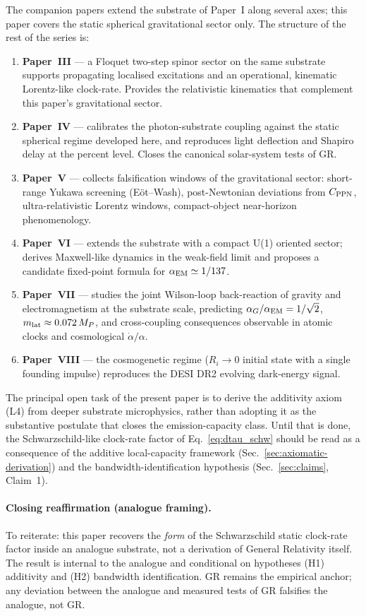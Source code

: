 \documentclass[11pt,a4paper]{article}
\begin{document}
The companion papers extend the substrate of Paper~I along several
axes; this paper covers the static spherical gravitational sector
only. The structure of the rest of the series is:

\begin{enumerate}
\item \textbf{Paper~III} --- a Floquet two-step spinor sector on the
same substrate supports propagating localised excitations and an
operational, kinematic Lorentz-like clock-rate. Provides the
relativistic kinematics that complement this paper's
gravitational sector.
\item \textbf{Paper~IV} --- calibrates the photon-substrate coupling
against the static spherical regime developed here, and reproduces
light deflection and Shapiro delay at the percent level. Closes
the canonical solar-system tests of GR.
\item \textbf{Paper~V} --- collects falsification windows of the
gravitational sector: short-range Yukawa screening (E\"ot--Wash),
post-Newtonian deviations from $C_{\rm PPN}$, ultra-relativistic
Lorentz windows, compact-object near-horizon phenomenology.
\item \textbf{Paper~VI} --- extends the substrate with a compact U(1)
oriented sector; derives Maxwell-like dynamics in the weak-field
limit and proposes a candidate fixed-point formula for
$\alpha_{\rm EM} \simeq 1/137$.
\item \textbf{Paper~VII} --- studies the joint Wilson-loop
back-reaction of gravity and electromagnetism at the substrate
scale, predicting $\alpha_G/\alpha_{\rm EM} = 1/\sqrt{2}$,
$m_{\rm lat} \approx 0.072\,M_P$, and cross-coupling consequences
observable in atomic clocks and cosmological $\dot\alpha/\alpha$.
\item \textbf{Paper~VIII} --- the cosmogenetic regime
($R_i \to 0$ initial state with a single founding impulse)
reproduces the DESI DR2 evolving dark-energy signal.
\end{enumerate}

The principal open task of the present paper is to derive the
additivity axiom (L4) from deeper substrate microphysics, rather
than adopting it as the substantive postulate that closes the
emission-capacity class. Until that is done, the
Schwarzschild-like clock-rate factor of
Eq.~\eqref{eq:dtau_schw} should be read as a consequence of the
additive local-capacity framework
(Sec.~\ref{sec:axiomatic-derivation}) and the
bandwidth-identification hypothesis
(Sec.~\ref{sec:claims}, Claim~1).





\paragraph{Closing reaffirmation (analogue framing).}
To reiterate: this paper recovers the \emph{form} of the
Schwarzschild static clock-rate factor inside an analogue
substrate, not a derivation of General Relativity itself. The
result is internal to the analogue and conditional on
hypotheses (H1) additivity and (H2) bandwidth identification.
GR remains the empirical anchor; any deviation between the
analogue and measured tests of GR falsifies the analogue, not
GR.
\end{document}
